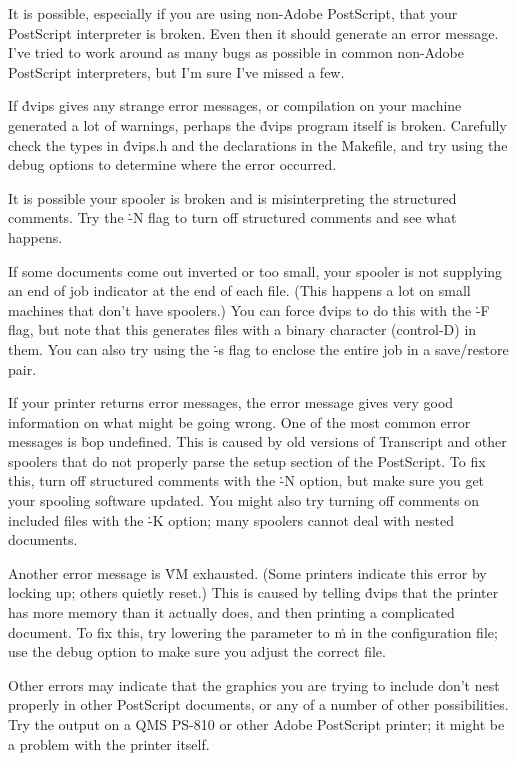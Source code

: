 It is possible, especially if you are using non-Adobe PostScript,
that your PostScript interpreter is broken.  Even then it should
generate an error message.  I've tried to work around as many bugs
as possible in common non-Adobe PostScript interpreters, but I'm
sure I've missed a few.

If \.{dvips} gives any strange error messages, or compilation on your
machine generated a lot of warnings, perhaps the \.{dvips} program
itself is broken.  Carefully check the types in \.{dvips.h} and
the declarations in the \.{Makefile}, and try using the debug options
to determine where the error occurred.

It is possible your spooler is broken and is misinterpreting the
structured comments.  Try the \.{-N} flag to turn off
structured comments and see what happens.


If some documents come out inverted or too small, your spooler is not
supplying an end of job indicator at the end of each file.  (This happens
a lot on small machines that don't have spoolers.)  You can
force \.{dvips} to do this with the \.{-F} flag, but note that this
generates files with a binary character (control-D) in them.  You can
also try using the \.{-s} flag to enclose the entire job in a save/restore
pair.


If your printer returns error messages, the error message gives very
good information on what might be going wrong.	One of the most common
error messages is \.{bop undefined}.  This is caused by old versions
of Transcript and other spoolers that do not properly parse the setup
section of the PostScript.  To fix this, turn off structured comments
with the \.{-N} option, but make sure you get your spooling software
updated.  You might also try turning off comments on included files
with the \.{-K} option; many spoolers cannot deal with nested
documents.

Another error message is \.{VM exhausted}.  (Some printers indicate
this error by locking up; others quietly reset.)  This is caused by telling
\.{dvips} that the printer has more memory than it actually does, and
then printing a complicated document.  To fix this, try lowering the
parameter to \.{m} in the configuration file; use the debug option
to make sure you adjust the correct file.

Other errors may indicate that the graphics you are trying to include
don't nest properly in other PostScript documents, or any of a number of
other possibilities.  Try the output on a QMS PS-810 or other Adobe
PostScript printer; it might be a problem with the printer itself.

